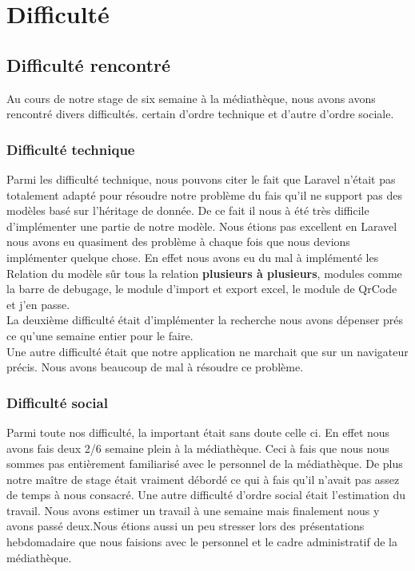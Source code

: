 \documentclass[12pt,a4paper]{article}
\begin{document}
\section{Difficulté}
\subsection{Difficulté rencontré}
Au cours de notre stage de six semaine à la médiathèque, nous avons avons rencontré divers 
difficultés. certain d'ordre technique et d'autre d'ordre sociale.
\subsubsection{Difficulté technique}
Parmi les difficulté technique, nous pouvons citer le fait que Laravel n'était pas totalement
adapté pour résoudre notre problème du fais qu'il ne support pas des modèles basé sur l'héritage
de donnée. De ce fait il nous à été très difficile d'implémenter une partie de notre modèle.
Nous étions pas excellent en Laravel nous avons eu quasiment des problème à chaque
fois que nous devions implémenter quelque chose. En effet nous avons eu du mal à implémenté les 
Relation du modèle sûr tous la relation \textbf{plusieurs à plusieurs}, modules comme la barre 
de debugage, le module d'import et export excel, le module de QrCode et j'en passe.\\
La deuxième difficulté était d'implémenter la recherche nous avons dépenser prés ce qu'une semaine entier pour le faire.\\
Une autre difficulté était que notre application ne marchait que sur un navigateur
précis. Nous avons beaucoup de mal à résoudre ce problème. 

\subsubsection{Difficulté social} 
Parmi toute nos difficulté, la important était sans doute celle ci. En effet nous avons
fais deux 2/6 semaine plein à la médiathèque. Ceci à fais que nous nous sommes pas 
entièrement familiarisé avec le personnel de la médiathèque. De plus notre maître 
de stage était vraiment débordé ce qui à fais qu'il n'avait pas assez de temps à nous
consacré. Une autre difficulté d'ordre social était l'estimation du travail. Nous
avons estimer un travail à une semaine mais finalement nous y avons passé deux.Nous
étions aussi un peu stresser lors des présentations hebdomadaire que nous faisions avec le personnel et le cadre administratif de la médiathèque.\\
\end{document}
